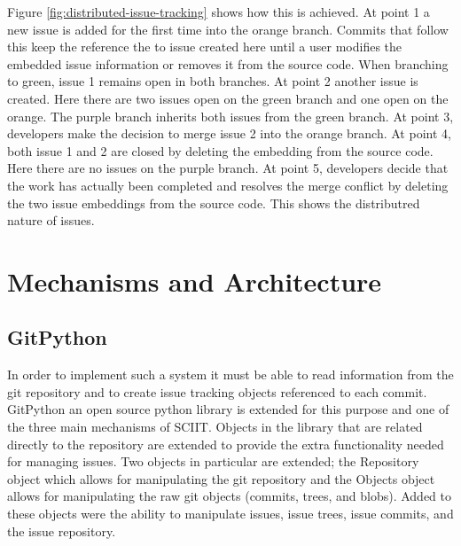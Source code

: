 \documentclass{mproj}
\begin{document}
Figure \ref{fig:distributed-issue-tracking} shows how this is achieved. At point 1 a new issue is added for the first time into the orange branch. Commits that follow this keep the reference the to issue created here until a user modifies the embedded issue information or removes it from the source code. When branching to green, issue 1 remains open in both branches. At point 2 another issue is created. Here there are two issues open on the green branch and one open on the orange. The purple branch inherits both issues from the green branch. At point 3, developers make the decision to merge issue 2 into the orange branch. At point 4, both issue 1 and 2 are closed by deleting the embedding from the source code. Here there are no issues on the purple branch. At point 5, developers decide that the work has actually been completed and resolves the merge conflict by deleting the two issue embeddings from the source code. This shows the distributred nature of issues.


\section{Mechanisms and Architecture}


\subsection{GitPython}

In order to implement such a system it must be able to read information from the git repository and to create issue tracking objects referenced to each commit. GitPython an open source python library is extended for this purpose and one of the three main mechanisms of SCIIT. Objects in the library that are related directly to the repository are extended to provide the extra functionality needed for managing issues. Two objects in particular are extended; the Repository object which allows for manipulating the git repository and the Objects object allows for manipulating the raw git objects (commits, trees, and blobs). Added to these objects were the ability to manipulate issues, issue trees, issue commits, and the issue repository.

\end{document}
